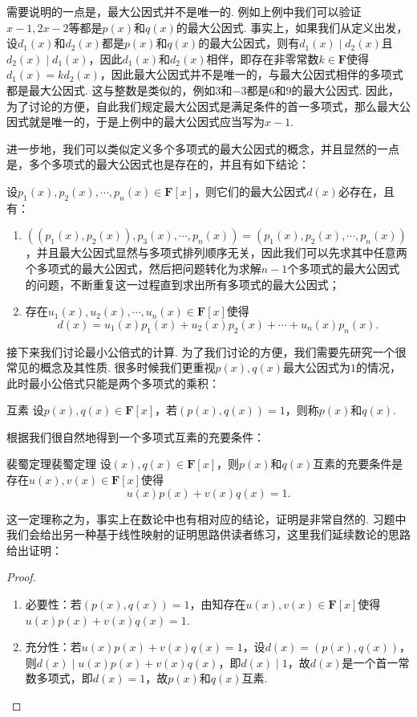 需要说明的一点是，最大公因式并不是唯一的. 例如上例中我们可以验证$x-1,2x-2$等都是$p(x)$和$q(x)$的最大公因式. 事实上，如果我们从定义出发，设$d_1(x)$和$d_2(x)$都是$p(x)$和$q(x)$的最大公因式，则有$d_1(x)\mid d_2(x)$且$d_2(x)\mid d_1(x)$，因此$d_1(x)$和$d_2(x)$相伴，即存在非零常数$k\in\mathbf{F}$使得$d_1(x)=kd_2(x)$，因此最大公因式并不是唯一的，与最大公因式相伴的多项式都是最大公因式. 这与整数是类似的，例如$3$和$-3$都是$6$和$9$的最大公因式. 因此，为了讨论的方便，自此我们规定最大公因式是满足条件的首一多项式，那么最大公因式就是唯一的，于是上例中的最大公因式应当写为$x-1$.

进一步地，我们可以类似定义多个多项式的最大公因式的概念，并且显然的一点是，多个多项式的最大公因式也是存在的，并且有如下结论：
\begin{theorem}{}{}
    设$p_1(x),p_2(x),\cdots,p_n(x)\in\mathbf{F}[x]$，则它们的最大公因式$d(x)$必存在，且有：
    \begin{enumerate}
        \item $((p_1(x),p_2(x)),p_3(x),\cdots,p_n(x))=(p_1(x),p_2(x),\cdots,p_n(x))$，并且最大公因式显然与多项式排列顺序无关，因此我们可以先求其中任意两个多项式的最大公因式，然后把问题转化为求解$n-1$个多项式的最大公因式的问题，不断重复这一过程直到求出所有多项式的最大公因式；
        \item 存在$u_1(x),u_2(x),\cdots,u_n(x)\in\mathbf{F}[x]$使得
              \[d(x)=u_1(x)p_1(x)+u_2(x)p_2(x)+\cdots+u_n(x)p_n(x).\]
    \end{enumerate}
\end{theorem}

接下来我们讨论最小公倍式的计算. 为了我们讨论的方便，我们需要先研究一个很常见的概念及其性质. 很多时候我们更重视$p(x),q(x)$最大公因式为$1$的情况，此时最小公倍式只能是两个多项式的乘积：
\begin{definition}{互素}{}
    设$p(x),q(x)\in\mathbf{F}[x]$，若$(p(x),q(x))=1$，则称$p(x)$和$q(x)$.
\end{definition}
根据我们很自然地得到一个多项式互素的充要条件：
\begin{theorem}{裴蜀定理}{裴蜀定理} 
    设$(x),q(x)\in\mathbf{F}[x]$，则$p(x)$和$q(x)$互素的充要条件是存在$u(x),v(x)\in\mathbf{F}[x]$使得\[u(x)p(x)+v(x)q(x)=1.\]
\end{theorem}
这一定理称之为，事实上在数论中也有相对应的结论，证明是非常自然的. 习题中我们会给出另一种基于线性映射的证明思路供读者练习，这里我们延续数论的思路给出证明：
\begin{proof}
    \begin{enumerate}
        \item 必要性：若$(p(x),q(x))=1$，由知存在$u(x),v(x)\in\mathbf{F}[x]$使得$u(x)p(x)+v(x)q(x)=1$.
        \item 充分性：若$u(x)p(x)+v(x)q(x)=1$，设$d(x)=(p(x),q(x))$，则$d(x)\mid u(x)p(x)+v(x)q(x)$，即$d(x)\mid 1$，故$d(x)$是一个首一常数多项式，即$d(x)=1$，故$p(x)$和$q(x)$互素.
    \end{enumerate}
\end{proof}

